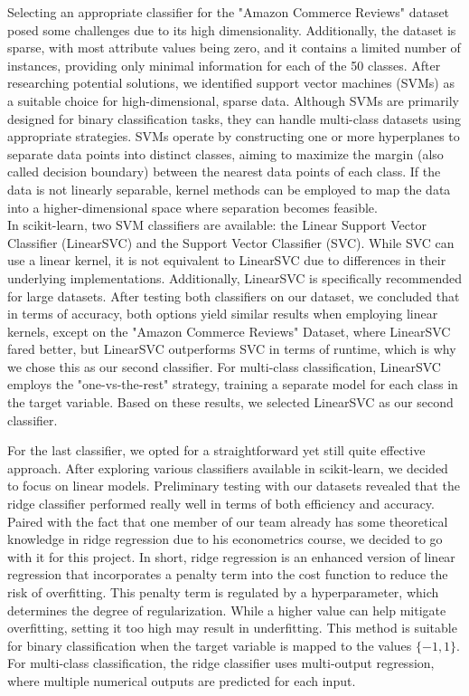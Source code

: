 \documentclass[a4paper,10pt]{article}
\begin{document}
Selecting an appropriate classifier for the "Amazon Commerce Reviews" dataset posed some challenges due to its high dimensionality. Additionally, the dataset is sparse, with most attribute values being zero, and it contains a limited number of instances, providing only minimal information for each of the 50 classes. After researching potential solutions, we identified support vector machines (SVMs) as a suitable choice for high-dimensional, sparse data. Although SVMs are primarily designed for binary classification tasks, they can handle multi-class datasets using appropriate strategies. SVMs operate by constructing one or more hyperplanes to separate data points into distinct classes, aiming to maximize the margin (also called decision boundary) between the nearest data points of each class. If the data is not linearly separable, kernel methods can be employed to map the data into a higher-dimensional space where separation becomes feasible. \\
In scikit-learn, two SVM classifiers are available: the Linear Support Vector Classifier (LinearSVC) and the Support Vector Classifier (SVC). While SVC can use a linear kernel, it is not equivalent to LinearSVC due to differences in their underlying implementations. Additionally, LinearSVC is specifically recommended for large datasets. After testing both classifiers on our dataset, we concluded that in terms of accuracy, both options yield similar results when employing linear kernels, except on the "Amazon Commerce Reviews" Dataset, where LinearSVC fared better, but LinearSVC outperforms SVC in terms of runtime, which is why we chose this as our second classifier. For multi-class classification, LinearSVC employs the "one-vs-the-rest" strategy, training a separate model for each class in the target variable. Based on these results, we selected LinearSVC as our second classifier.

For the last classifier, we opted for a straightforward yet still quite effective approach. After exploring various classifiers available in scikit-learn, we decided to focus on linear models. Preliminary testing with our datasets revealed that the ridge classifier performed really well in terms of both efficiency and accuracy. Paired with the fact that one member of our team already has some theoretical knowledge in ridge regression due to his econometrics course, we decided to go with it for this project. 
In short, ridge regression is an enhanced version of linear regression that incorporates a penalty term into the cost function to reduce the risk of overfitting. This penalty term is regulated by a hyperparameter, which determines the degree of regularization. While a higher value can help mitigate overfitting, setting it too high may result in underfitting. This method is suitable for binary classification when the target variable is mapped to the values $\{-1, 1\}$. For multi-class classification, the ridge classifier uses multi-output regression, where multiple numerical outputs are predicted for each input.
\end{document}
